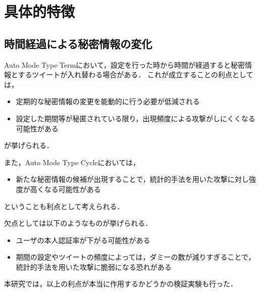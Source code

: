 \section{具体的特徴}\label{sec:feature}
\subsection{時間経過による秘密情報の変化}
Auto Mode Type Termにおいて，設定を行った時から時間が経過すると秘密情報とするツイートが入れ替わる場合がある．
これが成立することの利点としては，
\begin{itemize}
  \item 定期的な秘密情報の変更を能動的に行う必要が低減される
  \item 設定した期間等が秘匿されている限り，出現頻度による攻撃がしにくくなる可能性がある
\end{itemize}
が挙げられる．

また，Auto Mode Type Cycleにおいては，
\begin{itemize}
  \item 新たな秘密情報の候補が出現することで，統計的手法を用いた攻撃に対し強度が高くなる可能性がある
\end{itemize}
ということも利点として考えられる．

欠点としては以下のようなものが挙げられる．
\begin{itemize}
  \item ユーザの本人認証率が下がる可能性がある
  \item 期間の設定やツイートの頻度によっては，ダミーの数が減りすぎることで，統計的手法を用いた攻撃に脆弱になる恐れがある
\end{itemize}

本研究では，以上の利点が本当に作用するかどうかの検証実験も行った．

\newpage

